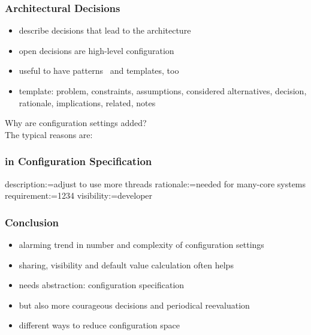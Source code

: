\begin{frame}
	\frametitle{Architectural Decisions}
	\begin{itemize}
	\item describe decisions that lead to the architecture
	\item open decisions are high-level configuration
	\item useful to have patterns~\cite{zdun2007patterns} and templates, too
	\item template: problem, constraints, assumptions, considered alternatives, decision, rationale, implications, related, notes
	\end{itemize}
\end{frame}

\begin{frame}
	Why are configuration settings added? \\[1cm]
	\pause
	The typical reasons are:
\end{frame}

\begin{frame}[fragile]
	\frametitle{in Configuration Specification}
	\begin{code}
	description:=adjust to use more threads
	rationale:=needed for many-core systems
	requirement:=1234
	visibility:=developer
	\end{code}
\end{frame}

\begin{frame}
	\frametitle{Conclusion}
	\begin{itemize}
	\item alarming trend in number and complexity of configuration settings
	\item sharing, visibility and default value calculation often helps
	\item needs abstraction: configuration specification
	\item but also more courageous decisions and periodical reevaluation
	\item different ways to reduce configuration space
	\end{itemize}
\end{frame}



\nocite{raab2017introducing}

\appendix

\begin{frame}[allowframebreaks]
	
	
\end{frame}




